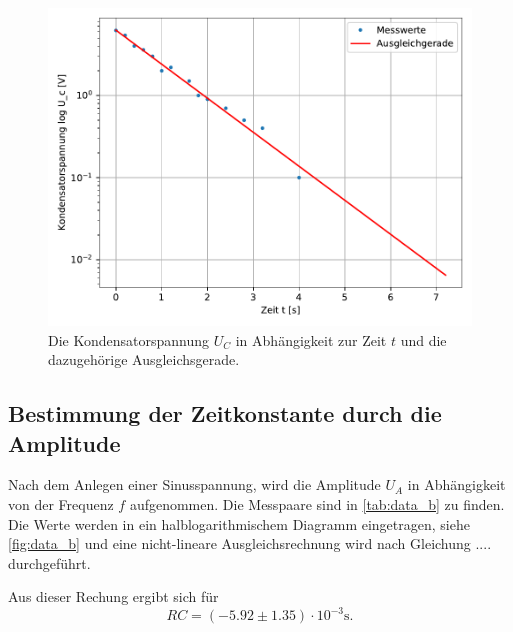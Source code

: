 \begin{figure}
  \centering
  \includegraphics{content/data_a_ausgleich.pdf}
  \caption{Die Kondensatorspannung $U_C$ in Abhängigkeit zur Zeit $t$ und die dazugehörige Ausgleichsgerade.}
  \label{fig:data_a}
\end{figure}

\subsection{Bestimmung der Zeitkonstante durch die Amplitude}
\label{subsec:Aufgabe_B}
Nach dem Anlegen einer Sinusspannung, wird die Amplitude $U_A$ in Abhängigkeit von der Frequenz $f$ aufgenommen.
Die Messpaare sind in \autoref{tab:data_b} zu finden.
Die Werte werden in ein halblogarithmischem Diagramm eingetragen, siehe \autoref{fig:data_b} und eine nicht-lineare Ausgleichsrechnung wird nach Gleichung .... durchgeführt.

\noindent
Aus dieser Rechung ergibt sich für 
\begin{equation*}
  RC = (-5.92 \pm 1.35) \cdot 10^{-3} \si{\second}.
\end{equation*}

